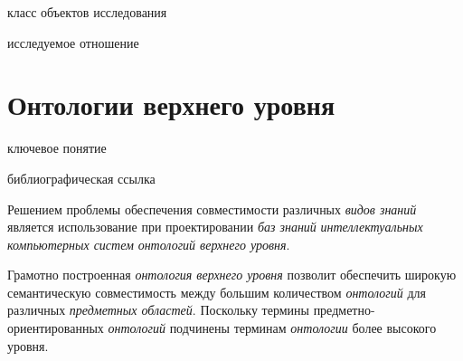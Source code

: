\begin{SCn}
	\begin{scnhaselementrolelist}{класс объектов исследования}
	\end{scnhaselementrolelist}
	\begin{scnhaselementrolelist}{исследуемое отношение}
	\end{scnhaselementrolelist}
\end{SCn}

\section{Онтологии верхнего уровня}
\label{sec_top_level_ontologies}

\begin{SCn}
	\begin{scnrelfromlist}{ключевое понятие}
	\end{scnrelfromlist}

\begin{scnrelfromlist}{библиографическая ссылка}
\end{scnrelfromlist}
\end{SCn}

Решением проблемы обеспечения совместимости различных \textit{видов знаний} является использование при проектировании \textit{баз знаний} \textit{интеллектуальных компьютерных систем} \textit{онтологий верхнего уровня}.

Грамотно построенная \textit{онтология верхнего уровня} позволит обеспечить широкую семантическую совместимость между большим количеством \textit{онтологий} для различных \textit{предметных областей}. Поскольку термины предметно-ориентированных \textit{онтологий} подчинены терминам \textit{онтологии} более высокого уровня.

